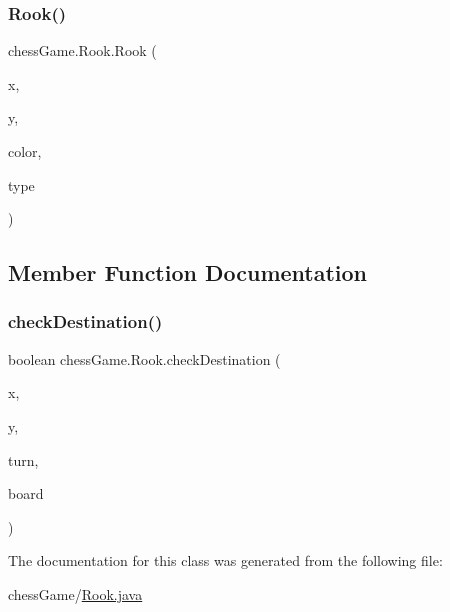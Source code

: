 \subsubsection{\texorpdfstring{Rook()}{Rook()}}
{\footnotesize\ttfamily chess\+Game.\+Rook.\+Rook (\begin{DoxyParamCaption}\item[{int}]{x,  }\item[{int}]{y,  }\item[{\hyperlink{classchess_game_1_1_piece_ad5117cbbbaebf3a27c4f3c2bcbd6678b}{color}}]{color,  }\item[{\hyperlink{classchess_game_1_1_piece_a1370c7f61581a1b72fa8ac2fd1af70a2}{type}}]{type }\end{DoxyParamCaption})}



\subsection{Member Function Documentation}
\hypertarget{classchess_game_1_1_rook_a8b9521d22b59e973c8bbd1e36dd70977}{}\label{classchess_game_1_1_rook_a8b9521d22b59e973c8bbd1e36dd70977} 
\subsubsection{\texorpdfstring{check\+Destination()}{checkDestination()}}
{\footnotesize\ttfamily boolean chess\+Game.\+Rook.\+check\+Destination (\begin{DoxyParamCaption}\item[{int}]{x,  }\item[{int}]{y,  }\item[{int}]{turn,  }\item[{\hyperlink{classchess_game_1_1_chess_board}{Chess\+Board}}]{board }\end{DoxyParamCaption})}



The documentation for this class was generated from the following file\+:\begin{DoxyCompactItemize}
\item 
chess\+Game/\hyperlink{_rook_8java}{Rook.\+java}\end{DoxyCompactItemize}
